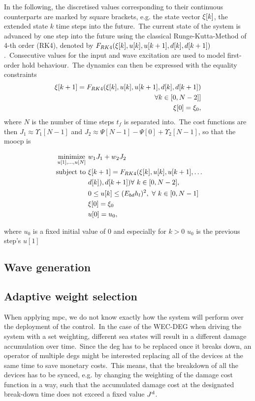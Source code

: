In the following, the discretised values corresponding to their continuous counterparts are marked by square brackets, e.g. the state vector $\xi[k]$, the extended state $k$ time steps into the future.\ 
The current state of the system is advanced by one step into the future using the classical Runge-Kutta-Method of 4-th order (RK4), denoted by $F_{RK4}(\xi[k], u[k], u[k+1], d[k], d[k+1])$.\ 
Consecutive values for the input and wave excitation are used to model first-order hold behaviour.\ 
The dynamics can then be expressed with the equality constraints
\begin{align*}
	\xi[k+1] = F_{RK4}(\xi[k], u[k], u[k+1], d[k], d[k+1]) \\
	\forall k\in\left[0,N-2]\right]\\
	\xi[0] = \xi_0,
\end{align*}
where $N$ is the number of time steps $t_f$ is separated into.\ 
The cost functions are then $J_1 \approx \Upsilon_1[N-1]$ and $J_2 \approx \Psi[N-1] - \Psi[0] + \Upsilon_2[N-1]$, so that the \ac{moocp} is
\begin{problem}\label{pb:problem_disc}
	\begin{align}\label{eq:problem2}
		\operatorname*{minimize}_{u[1],\ldots,u[N]} \ &w_1 J_1 + w_2 J_2 \nonumber\\
		\ \text{subject to} \ & \xi[k+1] = F_{RK4}(\xi[k], u[k], u[k+1],\dots\nonumber\\ &d[k]), d[k+1])  \forall \ k \in [0, N-2], \nonumber\\
		&0 \le  u[k] \le (E_{bd} h_l)^2, \ \forall \ k \in [0, N-1]\\
		& \xi[0] = \xi_0\\
		& u[0] = u_0,
	\end{align}
\end{problem}
where $u_0$ is a fixed initial value of 0 and especially for $k>0$ $u_0$ is the previous step's $u[1]$ 
\subsection{Wave generation}

\subsection{Adaptive weight selection}
When applying \ac{mpc}, we do not know exactly how the system will perform over the deployment of the control.\ 
In the case of the WEC-DEG when driving the system with a set weighting, different sea states will result in a different damage accumulation over time.\ 
Since the \ac{deg} has to be replaced once it breaks down, an operator of multiple \acp{deg} might be interested replacing all of the devices at the same time to save monetary costs.\ 
This means, that the breakdown of all the devices has to be synced, e.g. by changing the weighting of the damage cost function in a way, such that the accumulated damage cost at the designated break-down time \tbd does not exceed a fixed value $J^\mathrm{d}$.\ 

